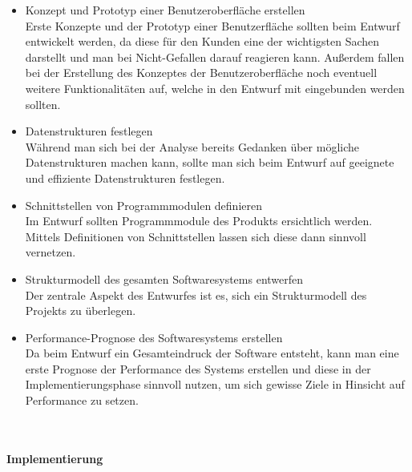 \documentclass[a4paper,graphics,11pt]{article}
\begin{document}
\begin{itemize}
\item Konzept und Prototyp einer Benutzeroberfläche erstellen\\
Erste Konzepte und der Prototyp einer Benutzerfläche sollten beim Entwurf entwickelt werden, da diese für den Kunden eine der wichtigsten Sachen darstellt und man
bei Nicht-Gefallen darauf reagieren kann. Außerdem fallen bei der Erstellung des Konzeptes der Benutzeroberfläche noch eventuell weitere Funktionalitäten auf, welche in 
den Entwurf mit eingebunden werden sollten.
\item Datenstrukturen festlegen\\
Während man sich bei der Analyse bereits Gedanken über mögliche Datenstrukturen machen kann, sollte man sich beim Entwurf auf geeignete und effiziente Datenstrukturen
festlegen.
\item Schnittstellen von Programmmodulen definieren\\
Im Entwurf sollten Programmmodule des Produkts ersichtlich werden. Mittels Definitionen von Schnittstellen lassen sich diese dann sinnvoll vernetzen.
\item Strukturmodell des gesamten Softwaresystems entwerfen \\
Der zentrale Aspekt des Entwurfes ist es, sich ein Strukturmodell des Projekts zu überlegen.
\item Performance-Prognose des Softwaresystems erstellen\\
Da beim Entwurf ein Gesamteindruck der Software entsteht, kann man eine erste Prognose der Performance des Systems erstellen und diese in der Implementierungsphase
sinnvoll nutzen, um sich gewisse Ziele in Hinsicht auf Performance zu setzen.
\end{itemize} \ \\ \ \\
\textbf{Implementierung}
\end{document}
